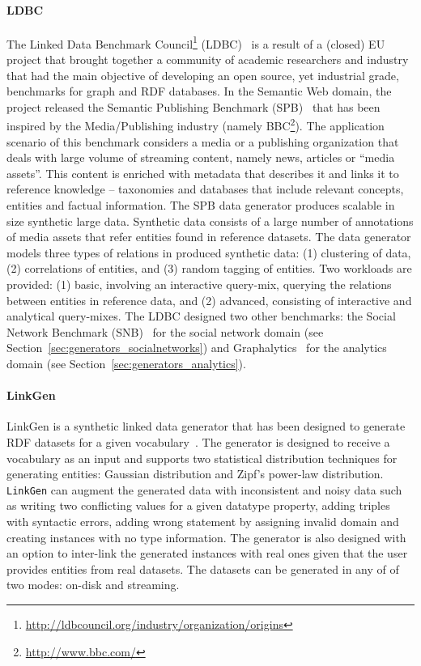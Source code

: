 \paragraph{LDBC}  The Linked Data Benchmark Council\footnote{\url{http://ldbcouncil.org/industry/organization/origins}} (LDBC)~\cite{Angles:2014:LDB:2627692.2627697} is a result of a (closed) EU project that brought together a community of academic researchers and industry that had the main objective of developing an open source, yet industrial grade, benchmarks for graph and RDF databases. \iffalse The following three benchmarks were developed and are currently maintained.\fi In the Semantic Web domain, the project released the Semantic Publishing Benchmark (SPB)~\cite{spb} that has been inspired by the Media/Publishing industry (namely BBC\footnote{\url{http://www.bbc.com/}}). The application scenario of this benchmark considers a media or a publishing organization that deals with large volume of streaming content, namely news, articles or  ``media assets''. This content is enriched with metadata that describes it and links it to reference knowledge -- taxonomies and databases that include relevant concepts, entities and factual information. The SPB data generator produces scalable in size synthetic large data. Synthetic data consists of a large number of annotations of media assets that refer entities found in reference datasets. The data generator models three types of relations in produced synthetic data: (1) clustering of data, (2) correlations of entities, and (3) random tagging of entities. Two workloads are provided: (1) basic, involving an interactive query-mix, querying the relations between entities in reference data, and (2) advanced,  consisting of interactive and analytical query-mixes. The LDBC designed two other benchmarks: the Social Network Benchmark (SNB)~\cite{Erling:2015:LSN:2723372.2742786} for the social network domain  (see Section~\ref{sec:generators_socialnetworks}) and Graphalytics~\cite{Iosup:2016:LGB:3007263.3007270}   for the analytics domain (see Section~\ref{sec:generators_analytics}).



\paragraph{LinkGen} LinkGen is a synthetic linked data generator that has been designed to generate RDF datasets for a given vocabulary~\cite{10.1007/978-3-319-46547-0_12}. The generator is designed to receive a vocabulary as an input  and supports two statistical distribution techniques for generating entities: Gaussian distribution and Zipf's power-law distribution. \texttt{LinkGen} can augment the generated data with inconsistent and noisy  data such as writing two conflicting values for a given datatype property,  adding triples with syntactic errors, adding wrong statement by assigning invalid domain and creating instances with no type information. The generator is also designed with  an option to inter-link the generated instances with real ones given that the user provides entities from real datasets. The datasets can be generated in any of of two modes: on-disk and streaming.

